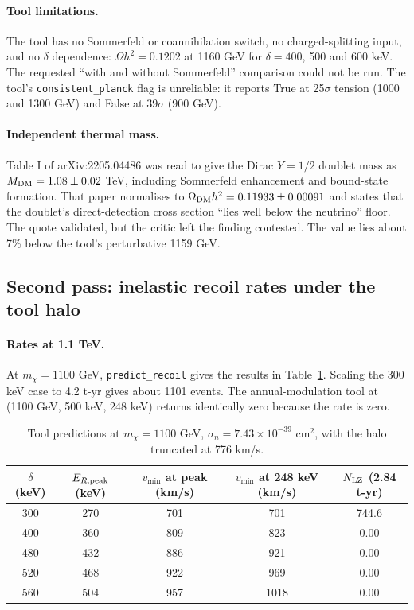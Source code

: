 \documentclass[11pt,a4paper]{article}
\begin{document}
\paragraph{Tool limitations.} The tool has no Sommerfeld or coannihilation switch, no charged-splitting input, and no $\delta$ dependence: $\Omega h^2=0.1202$ at 1160 GeV for $\delta=400$, 500 and 600 keV. The requested ``with and without Sommerfeld'' comparison could not be run. The tool's \texttt{consistent\_planck} flag is unreliable: it reports True at 25$\sigma$ tension (1000 and 1300 GeV) and False at 39$\sigma$ (900 GeV).

\paragraph{Independent thermal mass.} Table I of arXiv:2205.04486 was read to give the Dirac $Y=1/2$ doublet mass as $M_{\rm DM}=1.08\pm0.02$ TeV, including Sommerfeld enhancement and bound-state formation. That paper normalises to $\Omega_{\rm DM}h^2=0.11933\pm0.00091$ and states that the doublet's direct-detection cross section ``lies well below the neutrino'' floor. The quote validated, but the critic left the finding contested. The value lies about 7\% below the tool's perturbative 1159 GeV.

\subsection{Second pass: inelastic recoil rates under the tool halo}

\paragraph{Rates at 1.1 TeV.} At $m_\chi=1100$ GeV, \texttt{predict\_recoil} gives the results in Table~\ref{tab:rec}. Scaling the 300 keV case to 4.2 t-yr gives about 1101 events. The annual-modulation tool at (1100 GeV, 500 keV, 248 keV) returns identically zero because the rate is zero.

\begin{table}[h]
\centering
\begin{tabular}{ccccc}
\toprule
$\delta$ (keV) & $E_{R,\rm peak}$ (keV) & $v_{\min}$ at peak (km/s) & $v_{\min}$ at 248 keV (km/s) & $N_{\rm LZ}$ (2.84 t-yr)\\
\midrule
300 & 270 & 701 & 701 & 744.6\\
400 & 360 & 809 & 823 & 0.00\\
480 & 432 & 886 & 921 & 0.00\\
520 & 468 & 922 & 969 & 0.00\\
560 & 504 & 957 & 1018 & 0.00\\
\bottomrule
\end{tabular}
\caption{Tool predictions at $m_\chi=1100$ GeV, $\sigma_n=7.43\times10^{-39}$ cm$^2$, with the halo truncated at 776 km/s.}
\label{tab:rec}
\end{table}
\end{document}
